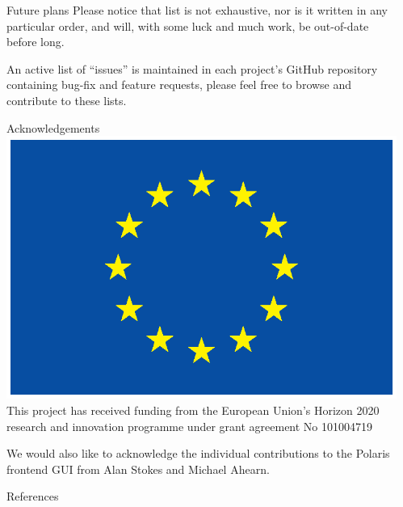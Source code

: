 \documentclass[final]{beamer}
\newlength{\sepwidth}
\newlength{\colwidth}
\newcommand{\separatorcolumn}{\begin{column}{\sepwidth}\end{column}}
\begin{document}
\begin{frame}[t]
\begin{columns}[t]
\begin{column}{\colwidth}
\begin{exampleblock}{Future plans}
                    Please notice that list is not exhaustive, nor is it written in any particular order,
                    and will, with some luck and much work, be out-of-date before long.

                    An active list of ``issues'' is maintained in each project's GitHub repository containing
                    bug-fix and feature requests, please feel free to browse and contribute to these lists.

                \end{exampleblock}

                \begin{block}{Acknowledgements}
                    \includegraphics[height=\baselineskip]{logos/EU_flag_yellow_eps}
                    This project has received funding from the European Union’s Horizon 2020 research and
                    innovation programme under grant agreement No 101004719

                    We would also like to acknowledge the individual contributions to the Polaris frontend
                    GUI from Alan Stokes and Michael Ahearn.
                \end{block}

                \begin{block}{References}

                    \nocite{*}
                    \footnotesize{}

                \end{block}

            \end{column}
            \separatorcolumn
        \end{columns}
    \end{frame}
\end{document}
